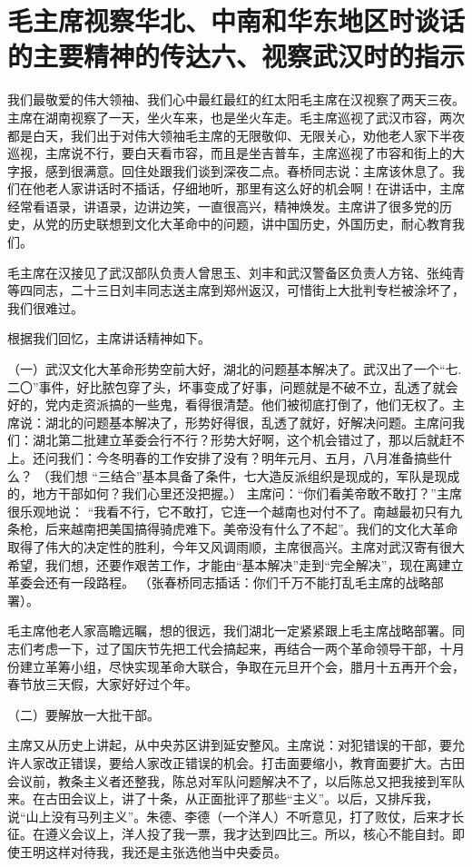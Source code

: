 \section[毛主席视察华北、中南和华东地区时谈话的主要精神的传达六、视察武汉时的指示]{毛主席视察华北、中南和华东地区时谈话的主要精神的传达六、视察武汉时的指示}


我们最敬爱的伟大领袖、我们心中最红最红的红太阳毛主席在汉视察了两天三夜。主席在湖南视察了一天，坐火车来，也是坐火车走。毛主席巡视了武汉市容，两次都是白天，我们出于对伟大领袖毛主席的无限敬仰、无限关心，劝他老人家下半夜巡视，主席说不行，要白天看市容，而且是坐吉普车，主席巡视了市容和街上的大字报，感到很满意。回住处跟我们谈到深夜二点。春桥同志说：主席该休息了。我们在他老人家讲话时不插话，仔细地听，那里有这么好的机会啊！在讲话中，主席经常看语录，讲语录，边讲边笑，一直很高兴，精神焕发。主席讲了很多党的历史，从党的历史联想到文化大革命中的问题，讲中国历史，外国历史，耐心教育我们。

  毛主席在汉接见了武汉部队负责人曾思玉、刘丰和武汉警备区负责人方铭、张纯青等四同志，二十三日刘丰同志送主席到郑州返汉，可惜街上大批判专栏被涂坏了，我们很难过。

根据我们回忆，主席讲话精神如下。

（一）武汉文化大革命形势空前大好，湖北的问题基本解决了。武汉出了一个“七.二〇”事件，好比脓包穿了头，坏事变成了好事，问题就是不破不立，乱透了就会好的，党内走资派搞的一些鬼，看得很清楚。他们被彻底打倒了，他们无权了。主席说：湖北的问题基本解决了，形势好得很，乱透了就好，好解决问题。主席问我们：湖北第二批建立革委会行不行？形势大好啊，这个机会错过了，那以后就赶不上。还问我们：今冬明春的工作安排了没有？明年元月、五月，八月准备搞些什么？  （我们想 “三结合”基本具备了条件，七大造反派组织是现成的，军队是现成的，地方干部如何？我们心里还没把握。） 主席问：“你们看美帝敢不敢打？”主席很乐观地说： “我看不行，它不敢打，它连一个越南也对付不了。南越最初只有九条枪，后来越南把美国搞得骑虎难下。美帝没有什么了不起”。我们的文化大革命取得了伟大的决定性的胜利，今年又风调雨顺，主席很高兴。主席对武汉寄有很大希望，我们想，还要作艰苦工作，才能由“基本解决”走到“完全解决”，现在离建立革委会还有一段路程。  （张春桥同志插话：你们千万不能打乱毛主席的战略部署）。

毛主席他老人家高瞻远瞩，想的很远，我们湖北一定紧紧跟上毛主席战略部署。同志们考虑一下，过了国庆节先把工代会搞起来，再结合一两个革命领导干部，十月份建立革筹小组，尽快实现革命大联合，争取在元旦开个会，腊月十五再开个会，春节放三天假，大家好好过个年。

（二）要解放一大批干部。

主席又从历史上讲起，从中央苏区讲到延安整风。主席说：对犯错误的干部，要允许人家改正错误，要给人家改正错误的机会。打击面要缩小，教育面要扩大。古田会议前，教条主义者还整我，陈总对军队问题解决不了，以后陈总又把我接到军队来。在古田会议上，讲了十条，从正面批评了那些“主义”。以后，又排斥我，说“山上没有马列主义”。朱德、李德（一个洋人）不听意见，打了败仗，后来才长征。在遵义会议上，洋人投了我一票，我才达到四比三。所以，核心不能自封。即使王明这样对待我，我还是主张选他当中央委员。

